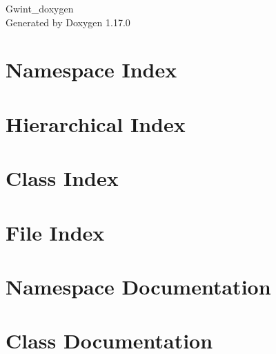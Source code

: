 \documentclass[twoside]{book}
\newcommand{\+}{\discretionary{\mbox{\scriptsize$\hookleftarrow$}}{}{}}
\newcommand{\clearemptydoublepage}{%
    \newpage{\pagestyle{empty}\cleardoublepage}%
  }
\begin{document}
  \raggedbottom
  \begin{titlepage}
  \vspace*{7cm}
  \begin{center}%
  {\Large Gwint\+\_\+doxygen}\\
  \vspace*{1cm}
  {\large Generated by Doxygen 1.17.0}\\
  \end{center}
  \end{titlepage}
  \clearemptydoublepage
  \tableofcontents
  \clearemptydoublepage
\chapter{Namespace Index}

\chapter{Hierarchical Index}

\chapter{Class Index}

\chapter{File Index}

\chapter{Namespace Documentation}

\chapter{Class Documentation}



























\end{document}
